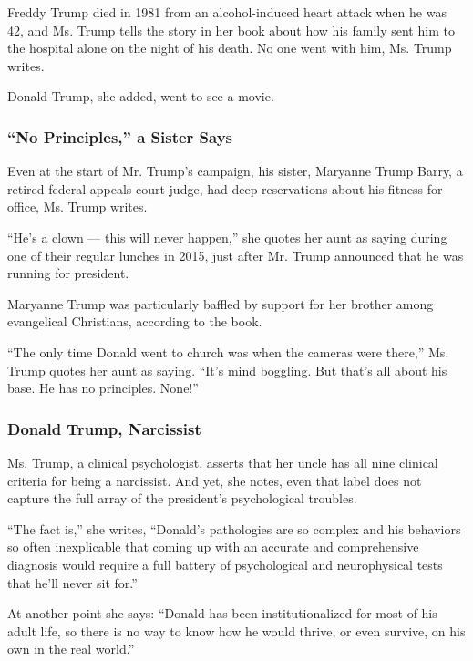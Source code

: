 Freddy Trump died in 1981 from an alcohol-induced heart attack when he
was 42, and Ms. Trump tells the story in her book about how his family
sent him to the hospital alone on the night of his death. No one went
with him, Ms. Trump writes.

Donald Trump, she added, went to see a movie.

\hypertarget{no-principles-a-sister-says}{%
\subsubsection{\texorpdfstring{\textbf{``No Principles,'' a Sister
Says}}{``No Principles,'' a Sister Says}}\label{no-principles-a-sister-says}}

Even at the start of Mr. Trump's campaign, his sister, Maryanne Trump
Barry, a retired federal appeals court judge, had deep reservations
about his fitness for office, Ms. Trump writes.

``He's a clown --- this will never happen,'' she quotes her aunt as
saying during one of their regular lunches in 2015, just after Mr. Trump
announced that he was running for president.

Maryanne Trump was particularly baffled by support for her brother among
evangelical Christians, according to the book.

``The only time Donald went to church was when the cameras were there,''
Ms. Trump quotes her aunt as saying. ``It's mind boggling. But that's
all about his base. He has no principles. None!''

\hypertarget{donald-trump-narcissist}{%
\subsubsection{\texorpdfstring{\textbf{Donald Trump,
Narcissist}}{Donald Trump, Narcissist}}\label{donald-trump-narcissist}}

Ms. Trump, a clinical psychologist, asserts that her uncle has all nine
clinical criteria for being a narcissist. And yet, she notes, even that
label does not capture the full array of the president's psychological
troubles.

``The fact is,'' she writes, ``Donald's pathologies are so complex and
his behaviors so often inexplicable that coming up with an accurate and
comprehensive diagnosis would require a full battery of psychological
and neurophysical tests that he'll never sit for.''

At another point she says: ``Donald has been institutionalized for most
of his adult life, so there is no way to know how he would thrive, or
even survive, on his own in the real world.''

